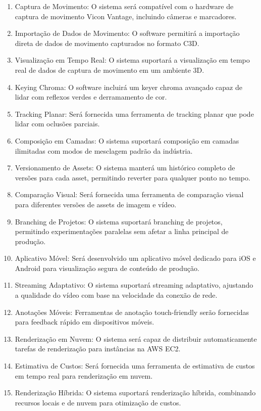 \begin{enumerate}
    \item Captura de Movimento: O sistema será compatível com o hardware de captura de movimento Vicon Vantage, incluindo câmeras e marcadores.
    \item Importação de Dados de Movimento: O software permitirá a importação direta de dados de movimento capturados no formato C3D.
    \item Visualização em Tempo Real: O sistema suportará a visualização em tempo real de dados de captura de movimento em um ambiente 3D.
    \item Keying Chroma: O software incluirá um keyer chroma avançado capaz de lidar com reflexos verdes e derramamento de cor.
    \item Tracking Planar: Será fornecida uma ferramenta de tracking planar que pode lidar com oclusões parciais.
    \item Composição em Camadas: O sistema suportará composição em camadas ilimitadas com modos de mesclagem padrão da indústria.
    \item Versionamento de Assets: O sistema manterá um histórico completo de versões para cada asset, permitindo reverter para qualquer ponto no tempo.
    \item Comparação Visual: Será fornecida uma ferramenta de comparação visual para diferentes versões de assets de imagem e vídeo.
    \item Branching de Projetos: O sistema suportará branching de projetos, permitindo experimentações paralelas sem afetar a linha principal de produção.
    \item Aplicativo Móvel: Será desenvolvido um aplicativo móvel dedicado para iOS e Android para visualização segura de conteúdo de produção.
    \item Streaming Adaptativo: O sistema suportará streaming adaptativo, ajustando a qualidade do vídeo com base na velocidade da conexão de rede.
    \item Anotações Móveis: Ferramentas de anotação touch-friendly serão fornecidas para feedback rápido em dispositivos móveis.
    \item Renderização em Nuvem: O sistema será capaz de distribuir automaticamente tarefas de renderização para instâncias na AWS EC2.
    \item Estimativa de Custos: Será fornecida uma ferramenta de estimativa de custos em tempo real para renderização em nuvem.
    \item Renderização Híbrida: O sistema suportará renderização híbrida, combinando recursos locais e de nuvem para otimização de custos.

\end{enumerate}
